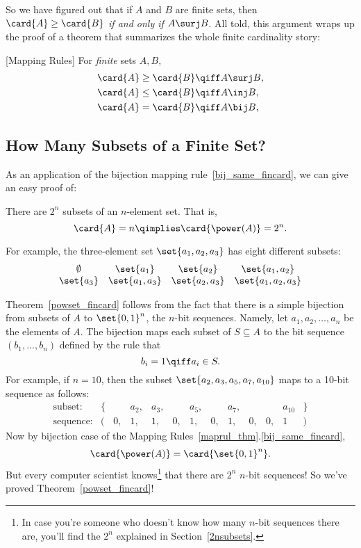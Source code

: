 So we have figured out that if $A$ and $B$ are finite sets, then
$\card{A} \geq \card{B}$ \emph{if and only if} $A \surj B$.  All told,
this argument wraps up the proof of a theorem that summarizes the
whole finite cardinality story:
\begin{theorem}\label{maprul_thm}
[Mapping Rules] \mbox{} For \emph{finite} sets $A,B$,
\begin{align}
\card{A} \geq \card{B} & \qiff A \surj B,\label{sur_ge_fincard}\\
\card{A} \leq \card{B} & \qiff A \inj B,\label{inj_le_fincard}\\
\card{A} = \card{B} & \qiff A \bij B,\label{bij_same_fincard}
\end{align}
\end{theorem}%
%

\subsection{How Many Subsets of a Finite Set?}
As an application of the bijection mapping%
rule~\eqref{bij_same_fincard}, we can give an easy proof of:
\begin{theorem}\label{powset_fincard}
There are $2^n$ subsets of an $n$-element set.  That is,
\[
\card{A} = n \qimplies \card{\power(A)} = 2^n.
\]
\end{theorem}

For example, the three-element set $\set{a_1, a_2, a_3}$ has eight
different subsets: %
\[
\begin{array}{cccc}
\emptyset & \set{a_1} & \set{a_2} & \set{a_1, a_2} \\ \set{a_3} &
\set{a_1, a_3} & \set{a_2, a_3} & \set{a_1, a_2, a_3}
\end{array}
\]

Theorem~\ref{powset_fincard} follows from the fact that there is a
simple bijection from subsets of $A$ to $\set{0,1}^n$, the $n$-bit
sequences.  Namely, let $a_1, a_2, \dots, a_n$ be the elements of $A$.
The bijection maps each subset of $S \subseteq A$ to the bit sequence
$(b_1, \dots, b_n)$ defined by the rule that
\[
b_i = 1 \qiff a_i \in S.
\]
For example, if $n = 10$, then the subset $\set{a_2, a_3, a_5, a_7,
  a_{10}}$ maps to a 10-bit sequence as follows: %
\[
\begin{array}{rrrrrrrrrrrrr}
\text{subset:} & \{ & & a_2, & a_3, & & a_5, & & a_7, & & & a_{10} &
\} \\ \text{sequence:} & ( & 0, & 1, & 1, & 0, & 1, & 0, & 1, & 0, &
0, & 1 & )
\end{array}
\]
Now by bijection case of the Mapping Rules~\ref{maprul_thm}.\eqref{bij_same_fincard},
\[
\card{\power(A)} = \card{\set{0,1}^n}.
\]
But every computer scientist knows\footnote{In case you're someone who
  doesn't know how many $n$-bit sequences there are, you'll find the
  $2^n$ explained in Section~\ref{2nsubsets}.}
  that there are $2^n$ $n$-bit sequences!  So we've proved
  Theorem~\ref{powset_fincard}!

\begin{problems}
\practiceproblems
{}

\classproblems
{}

\end{problems}

\endinput
